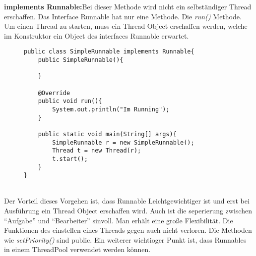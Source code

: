 \smallskip
\newline
\textbf{implements Runnable:}Bei dieser Methode wird nicht ein selbständiger Thread erschaffen. Das Interface Runnable hat nur eine Methode. Die \textit{run()} Methode.\cite{Java:Runnable} Um einen Thread zu starten, muss ein Thread Object erschaffen werden, welche im Konstruktor ein Object des interfaces Runnable erwartet.
\begin{figure}[h]
\begin{lstlisting}
public class SimpleRunnable implements Runnable{
    public SimpleRunnable(){

    }

    @Override
    public void run(){
        System.out.println("Im Running");
    }

    public static void main(String[] args){
        SimpleRunnable r = new SimpleRunnable();
        Thread t = new Thread(r);
        t.start();
    }
}
\end{lstlisting}
\end{figure}
\\Der Vorteil dieses Vorgehen ist, dass Runnable Leichtgewichtiger ist und erst bei Ausführung ein Thread Object erschaffen wird. Auch ist die seperierung zwischen ``Aufgabe'' und ``Bearbeiter'' sinvoll. Man erhält eine große Flexibilität. Die Funktionen des einstellen eines Threads gegen auch nicht verloren. Die Methoden wie \textit{setPriority()} sind public.\cite{Java:Thread} Ein weiterer wichtioger Punkt ist, dass Runnables in einem ThreadPool verwendet werden können.


